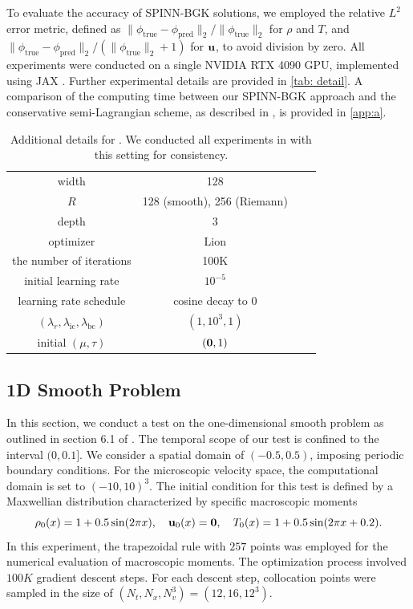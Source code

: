 \documentclass[preprint,12pt]{elsarticle}
\begin{document}
To evaluate the accuracy of SPINN-BGK solutions, we employed the relative $L^2$ error metric, defined as $\| \phi_\mathrm{true} - \phi_\mathrm{pred} \|_2 / \|\phi_\mathrm{true}\|_2$ for $\rho$ and $T$, and $\| \phi_\mathrm{true} - \phi_\mathrm{pred} \|_2 / (\|\phi_\mathrm{true}\|_2 + 1)$ for $\bf u$, to avoid division by zero.
All experiments were conducted on a single NVIDIA RTX 4090 GPU, implemented using JAX \cite{jax2018github}.
Further experimental details are provided in \eqref{tab: detail}.
A comparison of the computing time between our SPINN-BGK approach and the conservative semi-Lagrangian scheme, as described in \cite{cho2021conservative2}, is provided in \ref{app:a}.

\begin{table}
\centering
\begin{tabular}{ |c|c|c|c| } 
 \hline
    width & 128 \\
    $R$ & 128 (smooth), 256 (Riemann) \\
    depth & 3 \\
    optimizer & Lion \\
    the number of iterations & 100K \\
    initial learning rate & $10^{-5}$ \\
    learning rate schedule & cosine decay to $0$ \cite{loshchilov2016sgdr} \\
    $(\lambda_r, \lambda_\mathrm{ic}, \lambda_\mathrm{bc})$ & $(1, 10^3, 1)$ \\
    initial $(\mu, \tau)$ & $({\bf 0}, 1)$ \\
 \hline
\end{tabular}
\caption{
    Additional details for .
    We conducted all experiments in  with this setting for consistency.
}
\label{tab: detail}
\end{table}


\subsection{1D Smooth Problem}\label{sec:1d_smooth}
In this section, we conduct a test on the one-dimensional smooth problem as outlined in section 6.1 of \cite{li2023solving}.
The temporal scope of our test is confined to the interval $(0, 0.1]$.
We consider a spatial domain of $(-0.5, 0.5)$, imposing periodic boundary conditions.
For the microscopic velocity space, the computational domain is set to $(-10, 10)^3$.
The initial condition for this test is defined by a Maxwellian distribution characterized by specific macroscopic moments
\[
    \rho_0(x) = 1 + 0.5\sin(2\pi x), \quad
    {\bf u}_0(x) = {\bf 0}, \quad 
    T_0(x) = 1 + 0.5\sin(2\pi x + 0.2).
\]
In this experiment, the trapezoidal rule with $257$ points was employed for the numerical evaluation of macroscopic moments.
The optimization process involved $100K$ gradient descent steps. For each descent step, collocation points were sampled in the size of $(N_t, N_x, N_v^3) = (12, 16, 12^3)$.
\end{document}
